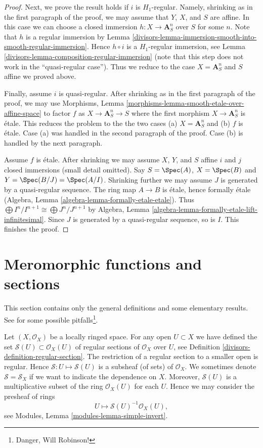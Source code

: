 \begin{proof}
\medskip\noindent
Next, we prove the result holds if $i$ is $H_1$-regular.
Namely, shrinking as in the first paragraph of the proof, we may assume that
$Y$, $X$, and $S$ are affine. In this case we can choose a closed
immersion $h : X \to \mathbf{A}^n_S$ over $S$ for some $n$. Note that
$h$ is a regular immersion by
Lemma \ref{divisors-lemma-immersion-smooth-into-smooth-regular-immersion}.
Hence $h \circ i$ is a $H_1$-regular immersion, see
Lemma \ref{divisors-lemma-composition-regular-immersion} (note that this step
does not work in the ``quasi-regular case'').
Thus we reduce to the case $X = \mathbf{A}^n_S$ and $S$ affine
we proved above.

\medskip\noindent
Finally, assume $i$ is quasi-regular. After shrinking as in the first
paragraph of the proof, we may use Morphisms, Lemma
\ref{morphisms-lemma-smooth-etale-over-affine-space}
to factor $f$ as $X \to \mathbf{A}^n_S \to S$ where the first
morphism $X \to \mathbf{A}^n_S$ is \'etale. This reduces the problem
to the the two cases (a) $X = \mathbf{A}^n_S$ and (b) $f$ is \'etale.
Case (a) was handled in the second paragraph of the proof.
Case (b) is handled by the next paragraph.

\medskip\noindent
Assume $f$ is \'etale. After shrinking we may assume $X$, $Y$, and $S$
affine $i$ and $j$ closed immersions (small detail omitted).
Say $S = \Spec(A)$, $X = \Spec(B)$ and $Y = \Spec(B/J) = \Spec(A/I)$.
Shrinking further we may assume $J$ is generated by a quasi-regular sequence.
The ring map $A \to B$ is \'etale, hence formally \'etale
(Algebra, Lemma \ref{algebra-lemma-formally-etale-etale}).
Thus $\bigoplus I^n/I^{n + 1} \cong \bigoplus J^n/J^{n + 1}$
by Algebra, Lemma \ref{algebra-lemma-formally-etale-lift-infinitesimal}.
Since $J$ is generated by a quasi-regular sequence, so is $I$.
This finishes the proof.
\end{proof}

\section{Meromorphic functions and sections}
\label{divisors-section-meromorphic-functions}
This section contains only the general definitions and some elementary results.
See \cite{misconceptions} for some possible
pitfalls\footnote{Danger, Will Robinson!}.

\medskip\noindent
Let $(X, \mathcal{O}_X)$ be a locally ringed space.
For any open $U \subset X$ we have defined the set
$\mathcal{S}(U) \subset \mathcal{O}_X(U)$
of regular sections of $\mathcal{O}_X$ over $U$, see
Definition \ref{divisors-definition-regular-section}. The restriction
of a regular section to a smaller open is regular. Hence
$\mathcal{S} : U \mapsto \mathcal{S}(U)$ is a subsheaf (of sets)
of $\mathcal{O}_X$. We sometimes denote $\mathcal{S} = \mathcal{S}_X$
if we want to indicate the dependence on $X$.
Moreover, $\mathcal{S}(U)$
is a multiplicative subset of the ring $\mathcal{O}_X(U)$ for
each $U$. Hence we may consider
the presheaf of rings
$$
U \longmapsto \mathcal{S}(U)^{-1} \mathcal{O}_X(U),
$$
see Modules, Lemma \ref{modules-lemma-simple-invert}.


